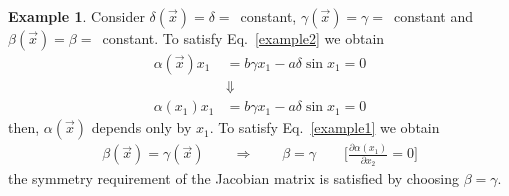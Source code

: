 \documentclass[11pt,a4paper,oneside]{book}
\numberwithin{equation}{section}
\theoremstyle{it}
\theoremstyle{definition}
\newtheorem{example}{Example}[chapter]
\begin{document}
\begin{example}
	Consider $\delta(\vec{x})=\delta=$~constant, 
	$\gamma(\vec{x})=\gamma=$~constant and $\beta(\vec{x})=\beta=$~constant. To 
	satisfy Eq.~\eqref{example2} we obtain
	\begin{equation*}
		\begin{aligned}
			\alpha(\vec{x})x_1 &=b\gamma x_1-a\delta \sin x_1=0 \\[6pt]
			&\Downarrow \\[6pt]
			\alpha(x_1)x_1 &=b\gamma x_1-a\delta \sin x_1=0
		\end{aligned}
	\end{equation*}
	then, $\alpha(\vec{x})$ depends only by $x_1$. To satisfy 
	Eq.~\eqref{example1} we obtain
	\begin{equation*}
		\begin{aligned}
			\beta(\vec{x})=\gamma(\vec{x}) \qquad\Rightarrow\qquad\beta=\gamma 
			\qquad\Big[\frac{\partial\alpha(x_1)}{\partial x_2}=0\Big]
		\end{aligned}
	\end{equation*}
	the symmetry requirement of the Jacobian matrix is satisfied by choosing 
	$\beta=\gamma$.
	

\end{example}
\end{document}
